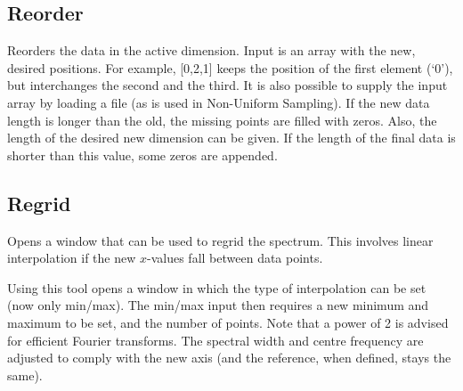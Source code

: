 \documentclass[11pt,a4paper]{article}
\begin{document}
\subsection{Reorder}
Reorders the data in the active dimension.
Input is an array with the new, desired positions.
For example, [0,2,1] keeps the position of the first element (`0'), but interchanges the second and the third.
It is also possible to supply the input array by loading a file (as is used in Non-Uniform Sampling).
If the new data length is longer than the old, the missing points are filled with zeros.
Also, the length of the desired new dimension can be given.
If the length of the final data is shorter than this value, some zeros are appended.

\subsection{Regrid}
Opens a window that can be used to regrid the spectrum.
This involves linear interpolation if the new $x$-values fall between data points.



Using this tool opens a window in which the type of interpolation can be set (now only min/max).
The min/max input then requires a new minimum and maximum to be set, and the number of points.
Note that a power of 2 is advised for efficient Fourier transforms.
The spectral width and centre frequency are adjusted to comply with the new axis (and the reference, when defined, stays the same).
\end{document}
